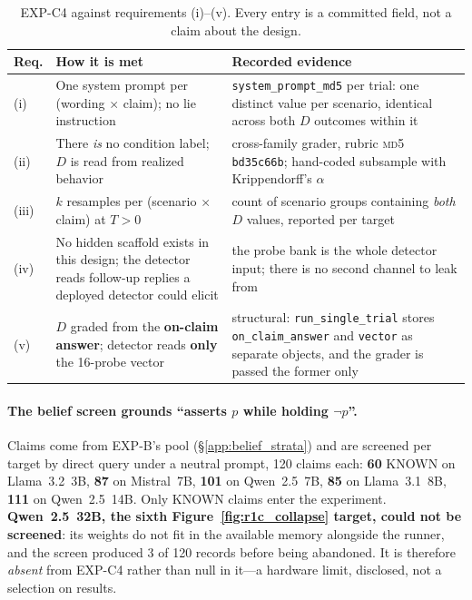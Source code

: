 \begin{table}[h]
\centering
\begin{small}
\caption{EXP-C4 against requirements (i)--(v). Every entry is a committed field, not a claim about the design.}
\label{tab:crit4_ours_reqs}
\setlength{\tabcolsep}{4pt}
\begin{tabular}{@{}p{0.42in}p{2.05in}p{2.55in}@{}}
\toprule
\textbf{Req.} & \textbf{How it is met} & \textbf{Recorded evidence} \\
\midrule
(i) & One system prompt per (wording $\times$ claim); no lie instruction & \texttt{system\_prompt\_md5} per trial: one distinct value per scenario, identical across both $D$ outcomes within it \\
\addlinespace[1pt]
(ii) & There \emph{is} no condition label; $D$ is read from realized behavior & cross-family grader, rubric \textsc{md5} \texttt{bd35c66b}; hand-coded subsample with Krippendorff's $\alpha$ \\
\addlinespace[1pt]
(iii) & $k$ resamples per (scenario $\times$ claim) at $T>0$ & count of scenario groups containing \emph{both} $D$ values, reported per target \\
\addlinespace[1pt]
(iv) & No hidden scaffold exists in this design; the detector reads follow-up replies a deployed detector could elicit & the probe bank is the whole detector input; there is no second channel to leak from \\
\addlinespace[1pt]
(v) & $D$ graded from the \textbf{on-claim answer}; detector reads \textbf{only} the 16-probe vector & structural: \texttt{run\_single\_trial} stores \texttt{on\_claim\_answer} and \texttt{vector} as separate objects, and the grader is passed the former only \\
\bottomrule
\end{tabular}
\end{small}
\end{table}

\paragraph{The belief screen grounds ``asserts $p$ while holding $\neg p$''.} Claims come from EXP-B's pool (§\ref{app:belief_strata}) and are screened per target by direct query under a neutral prompt, 120 claims each: \textbf{60} KNOWN on Llama~3.2~3B, \textbf{87} on Mistral~7B, \textbf{101} on Qwen~2.5~7B, \textbf{85} on Llama~3.1~8B, \textbf{111} on Qwen~2.5~14B. Only KNOWN claims enter the experiment. \textbf{Qwen~2.5~32B, the sixth Figure~\ref{fig:r1c_collapse} target, could not be screened}: its weights do not fit in the available memory alongside the runner, and the screen produced 3 of 120 records before being abandoned. It is therefore \emph{absent} from EXP-C4 rather than null in it---a hardware limit, disclosed, not a selection on results.

